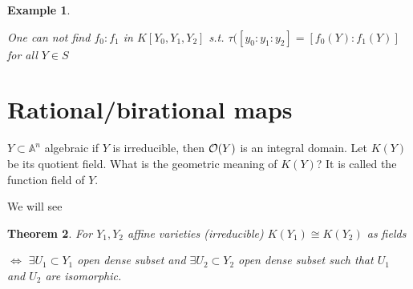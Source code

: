 \documentclass[11pt]{article}
\newtheorem{thm}{Theorem}[section]
\newtheorem{ex}[thm]{Example}
\newcommand{\affn}{\mathbb A}
\newcommand{\calo}{{\cal O}}
\newcommand{\Llrta}{\Longleftrightarrow}
\begin{document}
\begin{ex}
\begin{enumerate}[label=(\arabic*)]
			One can not find $f_0:f_1$ in $K[Y_0,Y_1,Y_2]$ s.t. $\tau([y_0:y_1:y_2]=[f_0(Y):f_1(Y)]$ for all $Y\in S$
		\end{enumerate}
	\end{ex}
	
	\section*{Rational/birational maps}
	
	$Y\subset \affn^n$ algebraic if $Y$ is irreducible, then $\calo(Y)$ is an integral domain. Let $K(Y)$ be its quotient field. What is the geometric meaning of $K(Y)$? It is called the function field of $Y$.
	
	We will see
	\begin{thm}
		For $Y_1,Y_2$ affine varieties (irreducible) $K(Y_1)\cong K(Y_2)$ as fields
		
		$\Llrta$ $\exists U_1\subset Y_1$ open dense subset and $\exists U_2\subset Y_2$ open dense subset such that $U_1$ and $U_2$ are isomorphic.
	\end{thm}
	
	
	
	
\end{document}
